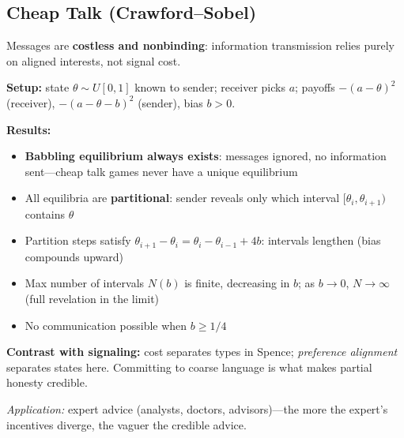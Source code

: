 \subsection{Cheap Talk (Crawford--Sobel)}
Messages are \textbf{costless and nonbinding}: information transmission relies purely on aligned interests, not signal cost.

\textbf{Setup:} state \(\theta \sim U[0,1]\) known to sender; receiver picks \(a\); payoffs \(-(a-\theta)^2\) (receiver), \(-(a-\theta-b)^2\) (sender), bias \(b > 0\).

\textbf{Results:}
\begin{itemize}[nosep]
    \item \textbf{Babbling equilibrium always exists}: messages ignored, no information sent---cheap talk games never have a unique equilibrium
    \item All equilibria are \textbf{partitional}: sender reveals only which interval \([\theta_i, \theta_{i+1})\) contains \(\theta\)
    \item Partition steps satisfy \(\theta_{i+1} - \theta_i = \theta_i - \theta_{i-1} + 4b\): intervals lengthen (bias compounds upward)
    \item Max number of intervals \(N(b)\) is finite, decreasing in \(b\); as \(b \to 0\), \(N \to \infty\) (full revelation in the limit)
    \item No communication possible when \(b \geq 1/4\)
\end{itemize}

\textbf{Contrast with signaling:} cost separates types in Spence; \textit{preference alignment} separates states here. Committing to coarse language is what makes partial honesty credible.

\textit{Application:} expert advice (analysts, doctors, advisors)---the more the expert's incentives diverge, the vaguer the credible advice.
